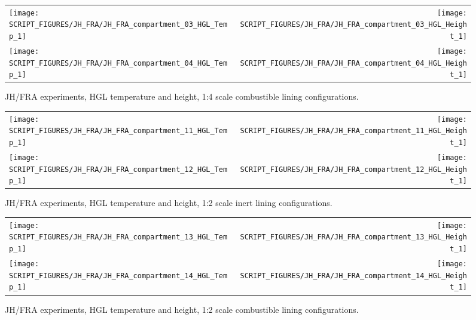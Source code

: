 \newpage

\begin{figure}[!h]
\begin{tabular*}{\textwidth}{l@{\extracolsep{\fill}}r}
\texttt{[image: SCRIPT\_FIGURES/JH\_FRA/JH\_FRA\_compartment\_03\_HGL\_Temp\_1]} &
\texttt{[image: SCRIPT\_FIGURES/JH\_FRA/JH\_FRA\_compartment\_03\_HGL\_Height\_1]} \\
\texttt{[image: SCRIPT\_FIGURES/JH\_FRA/JH\_FRA\_compartment\_04\_HGL\_Temp\_1]} &
\texttt{[image: SCRIPT\_FIGURES/JH\_FRA/JH\_FRA\_compartment\_04\_HGL\_Height\_1]} \\
\end{tabular*}
\caption[JH/FRA experiments, HGL temperature and height, 1:4 scale combustible lining configurations]
{JH/FRA experiments, HGL temperature and height, 1:4 scale combustible lining configurations.}
\label{JH_FRA_HGL_2}
\end{figure}

\newpage

\begin{figure}[!h]
\begin{tabular*}{\textwidth}{l@{\extracolsep{\fill}}r}
\texttt{[image: SCRIPT\_FIGURES/JH\_FRA/JH\_FRA\_compartment\_11\_HGL\_Temp\_1]} &
\texttt{[image: SCRIPT\_FIGURES/JH\_FRA/JH\_FRA\_compartment\_11\_HGL\_Height\_1]} \\
\texttt{[image: SCRIPT\_FIGURES/JH\_FRA/JH\_FRA\_compartment\_12\_HGL\_Temp\_1]} &
\texttt{[image: SCRIPT\_FIGURES/JH\_FRA/JH\_FRA\_compartment\_12\_HGL\_Height\_1]} \\
\end{tabular*}
\caption[JH/FRA experiments, HGL temperature and height, 1:2 scale inert lining configurations]
{JH/FRA experiments, HGL temperature and height, 1:2 scale inert lining configurations.}
\label{JH_FRA_HGL_3}
\end{figure}

\newpage

\begin{figure}[!h]
\begin{tabular*}{\textwidth}{l@{\extracolsep{\fill}}r}
\texttt{[image: SCRIPT\_FIGURES/JH\_FRA/JH\_FRA\_compartment\_13\_HGL\_Temp\_1]} &
\texttt{[image: SCRIPT\_FIGURES/JH\_FRA/JH\_FRA\_compartment\_13\_HGL\_Height\_1]} \\
\texttt{[image: SCRIPT\_FIGURES/JH\_FRA/JH\_FRA\_compartment\_14\_HGL\_Temp\_1]} &
\texttt{[image: SCRIPT\_FIGURES/JH\_FRA/JH\_FRA\_compartment\_14\_HGL\_Height\_1]} \\
\end{tabular*}
\caption[JH/FRA experiments, HGL temperature and height, 1:2 scale combustible lining configurations]
{JH/FRA experiments, HGL temperature and height, 1:2 scale combustible lining configurations.}
\label{JH_FRA_HGL_4}
\end{figure}

